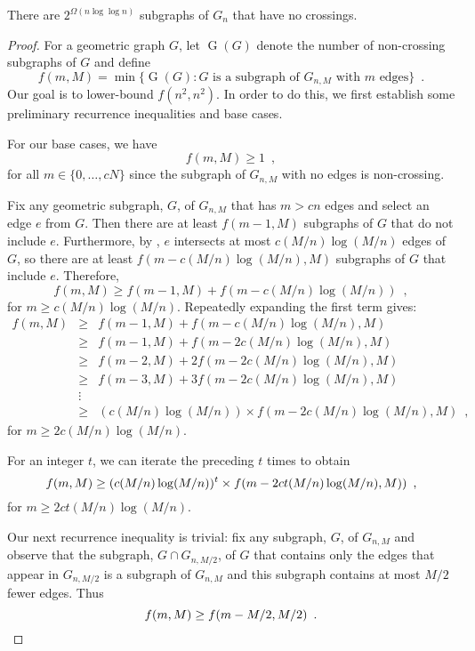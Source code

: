 \documentclass{patmorin}
\DeclareMathOperator{\ncs}{G}
\begin{document}
\begin{thm}
  There are $2^{\Omega(n\log\log n)}$ subgraphs of $G_n$ that have
  no crossings.
\end{thm}

\begin{proof}
For a geometric graph $G$, let $\ncs(G)$ denote the number of non-crossing
subgraphs of $G$ and define
\[
   f(m,M) = \min\{ \ncs(G) : \mbox{$G$ is a subgraph of $G_{n,M}$ with $m$ edges} \}
   \enspace . 
\]
Our goal is to lower-bound $f(n^2,n^2)$.  In order to do this, we first establish some preliminary recurrence inequalities and base cases.

For our base cases, we have 
\[ 
   f(m,M)\ge 1 \enspace ,
\]
for all $m\in\{0,\ldots,cN\}$ since the subgraph of $G_{n,M}$ with no
edges is non-crossing.

Fix any geometric subgraph, $G$, of $G_{n,M}$ that has $m> cn$
edges and select an edge $e$ from $G$. Then there are at least
$f(m-1,M)$ subgraphs of $G$ that do not include $e$.  Furthermore, by
, $e$ intersects at most $c(M/n)\log(M/n)$
edges of $G$, so there are at least $f(m-c(M/n)\log(M/n),M)$ subgraphs
of $G$ that include $e$.  Therefore,
\[  f(m,M) \ge f(m-1,M) + f(m-c(M/n)\log(M/n)) \enspace ,
\]
for $m\ge c(M/n)\log(M/n)$.  Repeatedly expanding the first term gives:
\begin{eqnarray*}
f(m,M) & \ge & f(m-1,M) + f(m-c(M/n)\log(M/n), M) \\
       & \ge & f(m-1,M) + f(m-2c(M/n)\log(M/n), M) \\
       & \ge & f(m-2,M) + 2f(m-2c(M/n)\log(M/n), M) \\
       & \ge & f(m-3,M) + 3f(m-2c(M/n)\log(M/n), M) \\
       & \vdots & \\
       & \ge & (c(M/n)\log(M/n))\times f(m-2c(M/n)\log(M/n), M) \enspace ,
\end{eqnarray*}
for $m\ge 2c(M/n)\log(M/n)$.

For an integer $t$, we can iterate the preceding $t$ times to obtain
\begin{equation}
   f(m,M) \ge (c(M/n)\log(M/n))^t\times f(m-2ct(M/n)\log(M/n), M)) \enspace ,
   \eqlabel{recur-a}
\end{equation} 
for $m\ge 2ct(M/n)\log(M/n)$.

Our next recurrence inequality is trivial: fix any subgraph, $G$,
of $G_{n,M}$ and observe that the subgraph, $G\cap G_{n,M/2}$, of $G$
that contains only the edges that appear in $G_{n,M/2}$ is a subgraph
of $G_{n,M}$ and this subgraph contains at most $M/2$ fewer edges.  Thus
\begin{equation}
  f(m,M) \ge f(m-M/2,M/2) \enspace .
  \eqlabel{recur-b}
\end{equation}


\end{proof}
\end{document}
